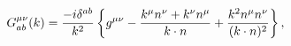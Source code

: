 \begin{equation}
G_{ab}^{\mu \nu }(k)=\frac{-i\delta ^{ab}}{k^{2}}\left\{ g^{\mu \nu }-\frac{%
k^{\mu }n^{\nu }+k^{\nu }n^{\mu }}{k\cdot n}+\frac{k^{2}n^{\mu }n^{\nu }}{%
(k\cdot n)^{2}}\right\} ,  \label{correct}
\end{equation}


